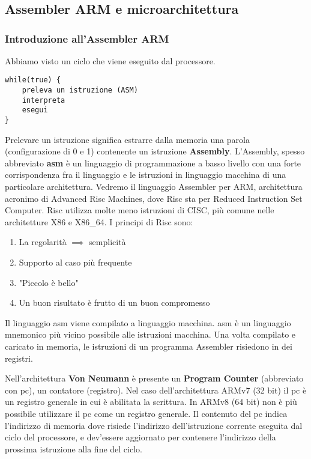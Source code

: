 \part{}
\chapter{Assembler ARM e microarchitettura}

\section{Introduzione all'Assembler ARM}

Abbiamo visto un ciclo che viene eseguito dal processore.
\begin{lstlisting}
while(true) {
	preleva un istruzione (ASM)
	interpreta
	esegui
}
\end{lstlisting} 

\begin{defn}
Prelevare un istruzione significa estrarre dalla memoria una parola (configurazione di 0 e 1) contenente un istruzione \textbf{Assembly}. L'Assembly, spesso abbreviato \textbf{asm} è un linguaggio di programmazione a basso livello con una forte corrispondenza fra il linguaggio e le istruzioni in linguaggio macchina di una particolare architettura. Vedremo il linguaggio Assembler per ARM, architettura acronimo di Advanced Risc Machines, dove Risc sta per Reduced Instruction Set Computer. Risc utilizza molte meno istruzioni di CISC, più comune nelle architetture X86 e X86\_64. I principi di Risc sono:
\begin{enumerate}
	\item La regolarità $ \implies $ semplicità
	\item Supporto al caso più frequente
	\item "Piccolo è bello"
	\item Un buon risultato è frutto di un buon compromesso
\end{enumerate}

Il linguaggio asm viene compilato a linguaggio macchina. asm è un linguaggio mnemonico più vicino possibile alle istruzioni macchina. Una volta compilato e caricato in memoria, le istruzioni di un programma Assembler risiedono in dei registri.
\end{defn}

\begin{defn}
Nell'architettura \textbf{Von Neumann} è presente un \textbf{Program Counter} (abbreviato con pc), un contatore (registro). Nel caso dell'architettura ARMv7 (32 bit) il pc è un registro generale in cui è abilitata la scrittura. In ARMv8 (64 bit) non è più possibile utilizzare il pc come un registro generale. Il contenuto del pc indica l'indirizzo di memoria dove risiede l'indirizzo dell'istruzione corrente eseguita dal ciclo del processore, e dev'essere aggiornato per contenere l'indirizzo della prossima istruzione alla fine del ciclo.
\end{defn}

